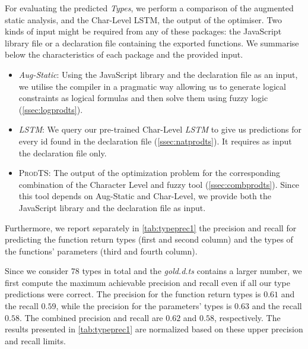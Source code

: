 \documentclass[sigplan,10pt,anonymous]{acmart} %
\newcommand{\prodts}{\textsc{ProdTS}\xspace}
\theoremstyle{plain}
\theoremstyle{remark}
\theoremstyle{definition}
\begin{document}
For evaluating the predicted \textit{Types}, we perform a comparison of the augmented static analysis, and the Char-Level LSTM, the output of the optimiser.
Two kinds of input might be required from any of these packages: the JavaScript library file or a declaration file containing the exported functions.
We summarise below the characteristics of each package and the provided input.
\begin{itemize}[label={\tiny$\bullet$}]
  \item \textit{Aug-Static}: Using the JavaScript library and the declaration file as an input, we utilise the compiler in a pragmatic way allowing us to generate logical constraints as logical formulas and then solve them using fuzzy logic (\cref{ssec:logprodts}).
  \item \textit{LSTM}: We query our pre-trained Char-Level \textit{LSTM} to give us predictions for every id found in the declaration file (\cref{ssec:natprodts}).
        It requires as input the declaration file only.
  \item \prodts: The output of the optimization problem for the corresponding combination of the Character Level and fuzzy tool (\cref{ssec:combprodts}).
        Since this tool depends on Aug-Static and Char-Level, we provide both the JavaScript library and the declaration file as input.
\end{itemize}
Furthermore, we report separately in \cref{tab:typeprec1} the precision and recall for predicting the function return types (first and second column) and the types of the functions' parameters (third and fourth column).

Since we consider $78$ types in total and the \textit{gold.d.ts} contains a larger number, we first compute the maximum achievable precision and recall even if all our type predictions were correct.
The precision for the function return types is $0.61$ and the recall $0.59$, while the precision for the parameters' types is $0.63$ and the recall $0.58$.
The combined precision and recall are $0.62$ and $0.58$, respectively.
The results presented in \cref{tab:typeprec1} are normalized based on these upper precision and recall limits.

\end{document}

